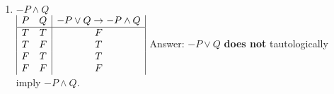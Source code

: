 \documentclass{article}
\begin{document}
\begin{enumerate}[label=(\alph*)]
\item \(-P \land Q\)\\
\(
\begin{array}{|c c|c|}
P & Q & -P \lor Q \rightarrow -P \land Q\\ 
\hline
T & T & F\\
T & F & T\\
F & T & T\\
F & F & F\\
\end{array}
\)
\singlespace
Answer: \(-P \lor Q\) \textbf{does not} tautologically imply \(-P \land Q\).\\
\medskip

\end{enumerate}
\end{document}
